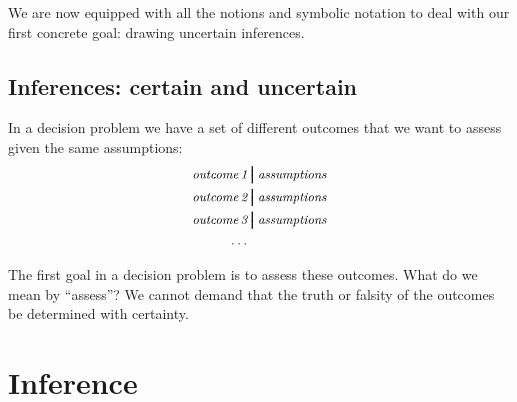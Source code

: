 \documentclass[
  a4paper,
  DIV=11,
  numbers=noendperiod,
  oneside]{scrreprt}
\begin{document}
\hfill\break

We are now equipped with all the notions and symbolic notation to deal
with our first concrete goal: drawing uncertain inferences.

\hypertarget{inferences-certain-and-uncertain}{%
\section{Inferences: certain and
uncertain}\label{inferences-certain-and-uncertain}}

In a decision problem we have a set of different outcomes that we want
to assess given the same assumptions: \[\begin{aligned}
\textit{\small outcome\,1} &\pmb{\nonscript\:\big\vert\nonscript\:\mathopen{}} \textit{\small assumptions}
\\
\textit{\small outcome\,2} &\pmb{\nonscript\:\big\vert\nonscript\:\mathopen{}} \textit{\small assumptions}
\\
\textit{\small outcome\,3} &\pmb{\nonscript\:\big\vert\nonscript\:\mathopen{}} \textit{\small assumptions}
\\
\dotso&
\end{aligned}\]

The first goal in a decision problem is to assess these outcomes. What
do we mean by ``assess''? We cannot demand that the truth or falsity of
the outcomes be determined with certainty.


\hypertarget{inference}{%
\chapter{Inference}\label{inference}}

\providecommand{\ul}{\uline}
\renewcommand*{\|}[1][]{\nonscript\:#1\vert\nonscript\:\mathopen{}}
\providecommand*{\pr}[1]{\textsf{\small`#1'}}
\renewcommand*{\pr}[1]{\textsf{\small`#1'}}
\providecommand*{\prq}[1]{\textsf{\small #1}}
\renewcommand*{\prq}[1]{\textsf{\small #1}}
\providecommand{\se}[1]{\mathsfit{#1}}
\renewcommand{\se}[1]{\mathsfit{#1}}
\providecommand{\p}{\mathrm{p}}
\renewcommand{\p}{\mathrm{p}}
\renewcommand{\P}{\mathrm{P}}
\end{document}
